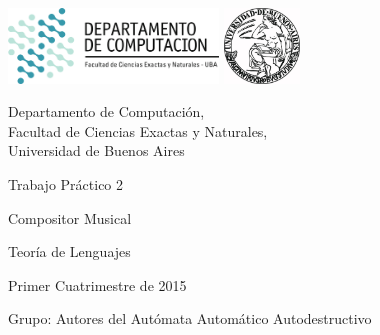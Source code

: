 \documentclass[a4paper, 10pt, twoside]{article}
\begin{document}




\thispagestyle{caratula}

\begin{center}

\includegraphics[height=2cm]{caratula/DC.png}
\hfill
\includegraphics[height=2cm]{caratula/UBA.jpg}

\vspace{2cm}

Departamento de Computación,\\
Facultad de Ciencias Exactas y Naturales,\\
Universidad de Buenos Aires

\vspace{4cm}

\begin{Huge}
Trabajo Práctico 2
\end{Huge}

\vspace{0.5cm}

\begin{huge}
Compositor Musical
\end{huge}

\vspace{0.5cm}

\begin{Large}
Teoría de Lenguajes
\end{Large}

\vspace{1cm}

Primer Cuatrimestre de 2015

\vspace{3.5cm}

\begin{Large}
Grupo: Autores del Autómata Automático Autodestructivo
\end{Large}


\end{center}
\end{document}
